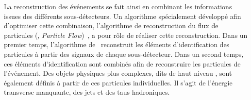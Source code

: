\par La reconstruction des événements se fait ainsi en combinant les informations issues des différents sous-détecteurs.
Un algorithme spécialement développé afin d'optimiser cette combinaison, l'algorithme de reconstruction du flux de particules (\PF, \emph{Particle Flow})~\cite{particle-flow,Dordevic_particle_flow}, a pour rôle de réaliser cette reconstruction.
Dans un premier temps, l'algorithme de \PF\ reconstruit les éléments d'identification des particules à partir des signaux de chaque sous-détecteur.
Dans un second temps, ces éléments d'identification sont combinés afin de reconstruire les particules de l'événement.
Des objets physiques plus complexes, dits de \og haut niveau \fg, sont également définis à partir de ces particules individuelles.
Il s'agit de l'énergie transverse manquante, des jets et des taus hadroniques.





